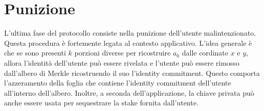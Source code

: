 \section{Punizione}
L'ultima fase del protocollo consiste nella punizione dell'utente malintenzionato. Questa procedura è fortemente legata
al contesto applicativo. L'idea generale è che se sono presenti $k$ porzioni diverse per ricostruire
$a_0$ dalle cordinate $x$ e $y$, allora l'identità dell'utente può essere rivelata e l'utente può essere rimosso
dall'albero di Merkle ricostruendo il suo l'identity commitment. Questo comporta
l'azzeramento della foglia che contiene l'identity commitment dell'utente all'interno dell'albero. Inoltre, a seconda dell'applicazione,
la chiave privata può anche essere usata per sequestrare la stake fornita dall'utente.